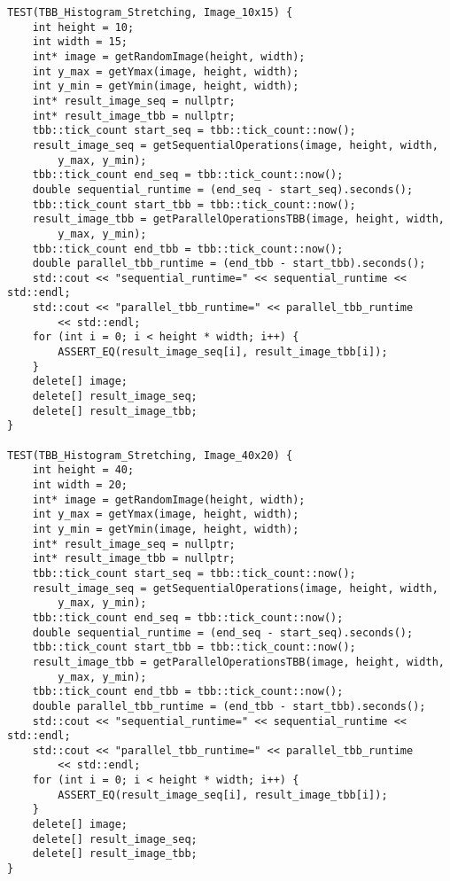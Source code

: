 \documentclass{report}
\begin{document}
\begin{lstlisting}
TEST(TBB_Histogram_Stretching, Image_10x15) {
    int height = 10;
    int width = 15;
    int* image = getRandomImage(height, width);
    int y_max = getYmax(image, height, width);
    int y_min = getYmin(image, height, width);
    int* result_image_seq = nullptr;
    int* result_image_tbb = nullptr;
    tbb::tick_count start_seq = tbb::tick_count::now();
    result_image_seq = getSequentialOperations(image, height, width,
        y_max, y_min);
    tbb::tick_count end_seq = tbb::tick_count::now();
    double sequential_runtime = (end_seq - start_seq).seconds();
    tbb::tick_count start_tbb = tbb::tick_count::now();
    result_image_tbb = getParallelOperationsTBB(image, height, width,
        y_max, y_min);
    tbb::tick_count end_tbb = tbb::tick_count::now();
    double parallel_tbb_runtime = (end_tbb - start_tbb).seconds();
    std::cout << "sequential_runtime=" << sequential_runtime << std::endl;
    std::cout << "parallel_tbb_runtime=" << parallel_tbb_runtime
        << std::endl;
    for (int i = 0; i < height * width; i++) {
        ASSERT_EQ(result_image_seq[i], result_image_tbb[i]);
    }
    delete[] image;
    delete[] result_image_seq;
    delete[] result_image_tbb;
}

TEST(TBB_Histogram_Stretching, Image_40x20) {
    int height = 40;
    int width = 20;
    int* image = getRandomImage(height, width);
    int y_max = getYmax(image, height, width);
    int y_min = getYmin(image, height, width);
    int* result_image_seq = nullptr;
    int* result_image_tbb = nullptr;
    tbb::tick_count start_seq = tbb::tick_count::now();
    result_image_seq = getSequentialOperations(image, height, width,
        y_max, y_min);
    tbb::tick_count end_seq = tbb::tick_count::now();
    double sequential_runtime = (end_seq - start_seq).seconds();
    tbb::tick_count start_tbb = tbb::tick_count::now();
    result_image_tbb = getParallelOperationsTBB(image, height, width,
        y_max, y_min);
    tbb::tick_count end_tbb = tbb::tick_count::now();
    double parallel_tbb_runtime = (end_tbb - start_tbb).seconds();
    std::cout << "sequential_runtime=" << sequential_runtime << std::endl;
    std::cout << "parallel_tbb_runtime=" << parallel_tbb_runtime
        << std::endl;
    for (int i = 0; i < height * width; i++) {
        ASSERT_EQ(result_image_seq[i], result_image_tbb[i]);
    }
    delete[] image;
    delete[] result_image_seq;
    delete[] result_image_tbb;
}


\end{lstlisting}
\end{document}
